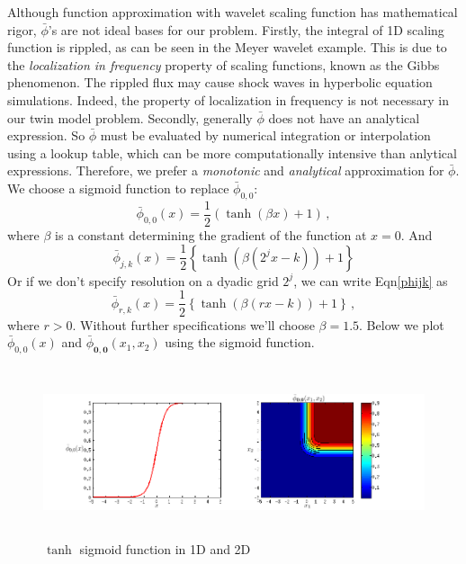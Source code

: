 \documentclass[a4paper,onecolumn]{article}
\theoremstyle{remark}
\begin{document}
\noindent Although function approximation with wavelet scaling function has mathematical
rigor, $\bar{\phi}$'s are not ideal bases for our problem. Firstly, the
integral of 1D scaling function is rippled, as can be seen in the Meyer wavelet example.
This is due to the \emph{localization in frequency}
property of scaling functions, known as the Gibbs phenomenon. 
The rippled flux may cause shock waves in hyperbolic equation simulations.
Indeed, the property of localization in frequency is not necessary in our
twin model problem.
Secondly, generally $\bar{\phi}$ does not have an analytical expression. 
So $\bar{\phi}$ must be evaluated by numerical integration or interpolation
using a lookup table, which can be more computationally intensive than
anlytical expressions. Therefore, we prefer a \emph{monotonic} and \emph{analytical}
 approximation for $\bar{\phi}$.\\

\noindent We choose a sigmoid function to replace $\bar{\phi}_{0,0}$:
\begin{equation}
    \bar{\phi}_{0,0}(x) = \frac{1}{2}\left(\tanh(\beta x)+1\right)\,,
\end{equation}
where $\beta$ is a constant determining the gradient of the function at $x=0$.
And
\begin{equation}
    \bar{\phi}_{j,k}(x) = \frac{1}{2} \left\{
        \tanh\left(\beta(2^j x-k)\right) +1
    \right\}
    \label{phijk}
\end{equation}
Or if we don't specify resolution on a dyadic grid $2^j$, we can write Eqn\eqref{phijk} as
\begin{equation}
    \bar{\phi}_{r,k}(x) = \frac{1}{2} \left\{
        \tanh\left(\beta(r x-k)\right) +1
    \right\}\,,
    \label{phirk}
\end{equation}
where $r>0$.
Without further specifications we'll choose $\beta=1.5$.
Below we plot $\bar{\phi}_{0,0}(x)$ and $\bar{\phi}_{\mathbf{0},\mathbf{0}}(x_1,x_2)$ 
using the sigmoid function.
\begin{figure}[H]\begin{center}
    \includegraphics[height=5cm]{sigmoid_basis.png}
    \caption{$\tanh$ sigmoid function in 1D and 2D}
    \label{fig:sigmoid basis}
\end{center}\end{figure}
\end{document}

